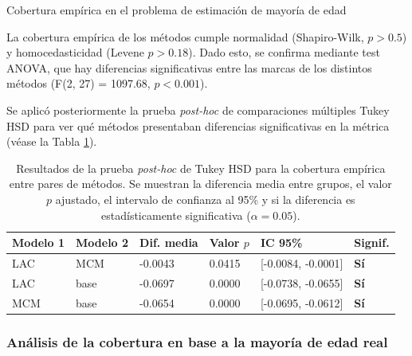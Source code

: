\begin{StatisticsRef}{Cobertura empírica en el problema de estimación de mayoría de edad}

    La cobertura empírica de los métodos cumple normalidad (Shapiro-Wilk, $p > 0.5$) y homocedasticidad (Levene $p > 0.18$). Dado esto, se confirma mediante test ANOVA, que hay diferencias significativas entre las marcas de los distintos métodos (F(2, 27) = 1097.68, $p < 0.001$).

    Se aplicó posteriormente la prueba \textit{post-hoc} de comparaciones múltiples Tukey HSD para ver qué métodos presentaban diferencias significativas en la métrica (véase la Tabla \ref{tab:AMM_tukey_EC}).

    \renewcommand{\arraystretch}{1.2}
    \begin{table}[H]
        \small
        \centering
        \begin{tabular}{llllll}
        \toprule
        \textbf{Modelo 1} & \textbf{Modelo 2} & \textbf{Dif. media} & \textbf{Valor $p$} & \textbf{IC 95\%} & \textbf{Signif.} \\ \hline
        LAC & MCM & -0.0043 & 0.0415 & [-0.0084, -0.0001] & \textbf{Sí} \\
        LAC & base & -0.0697 & 0.0000 & [-0.0738, -0.0655] & \textbf{Sí} \\
        MCM & base & -0.0654 & 0.0000 & [-0.0695, -0.0612] & \textbf{Sí} \\
        \bottomrule
        \end{tabular}
        \caption[
            Problema de estimación de mayoría de edad: 
            Resultados de la prueba \textit{post-hoc} de Tukey HSD para la cobertura empírica entre pares de métodos.
        ]{
            Resultados de la prueba \textit{post-hoc} de Tukey HSD para la cobertura empírica entre pares de métodos.
            Se muestran la diferencia media entre grupos, el valor $p$ ajustado, el intervalo de confianza al 95\% y si la diferencia es estadísticamente significativa ($\alpha = 0.05$).
        }
        \label{tab:AMM_tukey_EC}
    \end{table}
\end{StatisticsRef}


\FloatBarrier

\subsubsection{Análisis de la cobertura en base a la mayoría de edad real}

